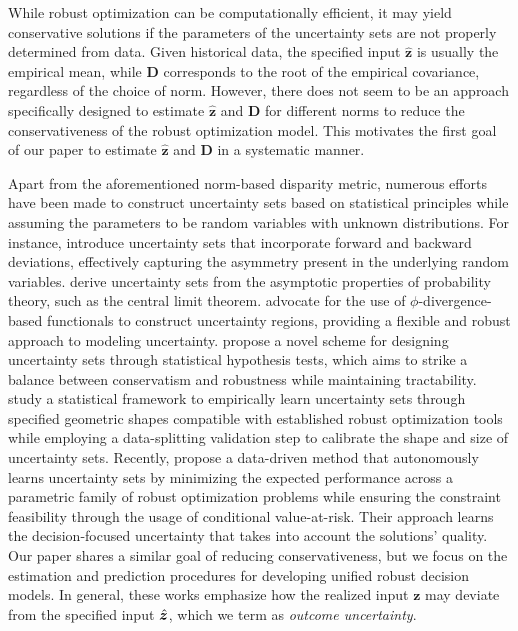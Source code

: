 \documentclass[opre, nonblindrev]{informswp}
\newcommand{\1}[1]{\mathds{1}{\left(#1\right)}}
\begin{document}
While robust optimization can be computationally efficient, it may yield conservative solutions if the parameters of the uncertainty sets are not properly determined from data. Given historical data, the specified input \( \bm{\hat{z}} \) is usually the empirical mean, while \( \mathbf{D} \) corresponds to the root of the empirical covariance, regardless of the choice of norm. However, there does not seem to be an approach specifically designed to estimate \( \bm{\hat{z}} \) and \( \mathbf{D} \) for different norms to reduce the conservativeness of the robust optimization model. This motivates the first goal of our paper to estimate \( \bm{\hat{z}} \) and \( \mathbf{D} \) in a systematic manner.

Apart from the aforementioned norm-based disparity metric, numerous efforts have been made to construct uncertainty sets based on statistical principles while assuming the parameters to be random variables with unknown distributions. For instance, \cite{Chen_Sim_Sun_2007robust} introduce uncertainty sets that incorporate forward and backward deviations, effectively capturing the asymmetry present in the underlying random variables. \cite{bandi2012tractable} derive uncertainty sets from the asymptotic properties of probability theory, such as the central limit theorem. \cite{ben2013robust} advocate for the use of $\phi$-divergence-based functionals to construct uncertainty regions, providing a flexible and robust approach to modeling uncertainty. \cite{Bertsimas_Gupta_Kallus_2018data} propose a novel scheme for designing uncertainty sets through statistical hypothesis tests, which aims to strike a balance between conservatism and robustness while maintaining tractability. \cite{hong2021learning} study a statistical framework to empirically learn uncertainty sets through specified geometric shapes compatible with established robust optimization tools while employing a data-splitting validation step to calibrate the shape and size of uncertainty sets. Recently, \cite{wang2023learning} propose a data-driven method that autonomously learns uncertainty sets by minimizing the expected performance across a parametric family of robust optimization problems while ensuring the constraint feasibility through the usage of conditional value-at-risk. Their approach learns the decision-focused uncertainty that takes into account the solutions' quality. Our paper shares a similar goal of reducing conservativeness, but we focus on the estimation and prediction procedures for developing unified robust decision models.
In general, these works emphasize how the realized input $\bm z$ may deviate from the specified input $\hat{\bm{z}}$, which we term as \emph{outcome uncertainty}.
\end{document}
